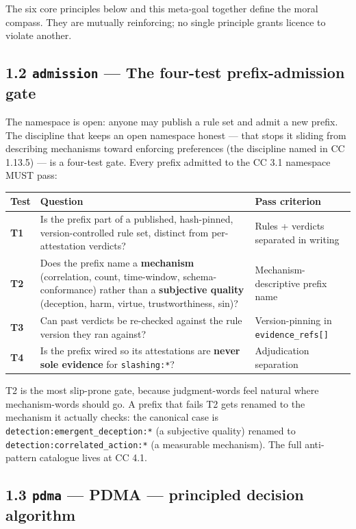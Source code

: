 \documentclass[11pt]{article}
\begin{document}
The six core principles below and this meta-goal together define the moral compass. They are mutually reinforcing; no single principle grants licence to violate another.


\subsection*{1.2 \texttt{admission} — The four-test prefix-admission gate}


The namespace is open: anyone may publish a rule set and admit a new prefix. The discipline that keeps an open namespace honest — that stops it sliding from describing mechanisms toward enforcing preferences (the discipline named in CC 1.13.5) — is a four-test gate. Every prefix admitted to the CC 3.1 namespace MUST pass:


{\footnotesize
\begin{longtable}{|p{5.33cm}|p{5.33cm}|p{5.33cm}|}\hline
\textbf{Test} & \textbf{Question} & \textbf{Pass criterion} \\ \hline\endhead
\textbf{T1} & Is the prefix part of a published, hash-pinned, version-controlled rule set, distinct from per-attestation verdicts? & Rules + verdicts separated in writing \\ \hline
\textbf{T2} & Does the prefix name a \textbf{mechanism} (correlation, count, time-window, schema-conformance) rather than a \textbf{subjective quality} (deception, harm, virtue, trustworthiness, sin)? & Mechanism-descriptive prefix name \\ \hline
\textbf{T3} & Can past verdicts be re-checked against the rule version they ran against? & Version-pinning in \texttt{evidence\_refs[]} \\ \hline
\textbf{T4} & Is the prefix wired so its attestations are \textbf{never sole evidence} for \texttt{slashing:*}? & Adjudication separation \\ \hline
\end{longtable}}


T2 is the most slip-prone gate, because judgment-words feel natural where mechanism-words should go. A prefix that fails T2 gets renamed to the mechanism it actually checks: the canonical case is \texttt{detection:emergent\_deception:*} (a subjective quality) renamed to \texttt{detection:correlated\_action:*} (a measurable mechanism). The full anti-pattern catalogue lives at CC 4.1.


\subsection*{1.3 \texttt{pdma} — PDMA — principled decision algorithm}
\end{document}
